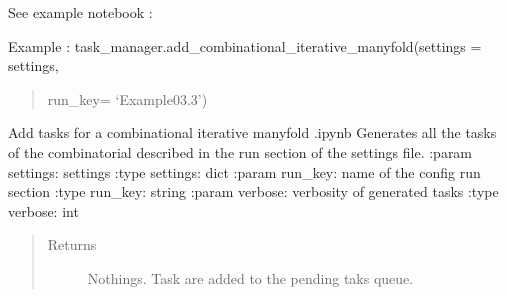 \documentclass[letterpaper,10pt,english]{sphinxmanual}
\begin{document}
\sphinxAtStartPar
See example notebook : 

\sphinxAtStartPar
Example :
{\color{red}\bfseries{}\textasciigrave{}\textasciigrave{}}\textasciigrave{}
task\_manager.add\_combinational\_iterative\_manyfold(settings = settings,
\begin{quote}

\sphinxAtStartPar
run\_key= ‘Example\sphinxhyphen{}03.3’)
\end{quote}

\sphinxAtStartPar
{\color{red}\bfseries{}\textasciigrave{}\textasciigrave{}}{\color{red}\bfseries{}\textasciigrave{}}

\begin{fulllineitems}
\label{\detokenize{pyterk:pyterk.task_manager.add_combinational_iterative_manyfold}}
\sphinxAtStartPar
Add tasks for a combinational iterative manyfold \sphinxhyphen{} .ipynb
Generates all the tasks of the combinatorial described in the run section of the settings file.
:param settings: settings
:type settings: dict
:param run\_key: name of the config run section
:type run\_key: string
:param verbose: verbosity of generated tasks
:type verbose: int
\begin{quote}\begin{description}
\item[{Returns}] \leavevmode
\sphinxAtStartPar
Nothings. Task are added to the pending taks queue.

\end{description}\end{quote}

\end{fulllineitems}

\end{document}
